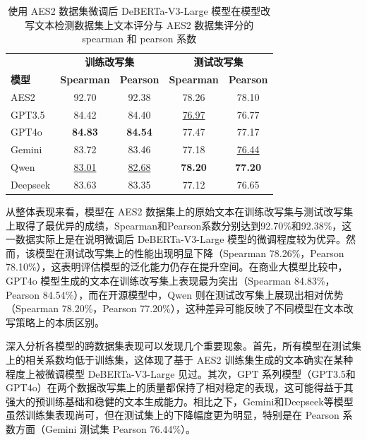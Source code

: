 \begin{table}[htbp]
\centering
\caption{使用 AES2 数据集微调后 DeBERTa-V3-Large 模型在模型改写文本检测数据集上文本评分与 AES2 数据集评分的 spearman 和 pearson 系数}
\begin{tabular}{l|cc|cc}
\toprule
\textbf{} & \multicolumn{2}{c}{\textbf{训练改写集}}    & \multicolumn{2}{c}{\textbf{测试改写集}} \\
\textbf{模型} & \textbf{Spearman}  & \textbf{Pearson} & \textbf{Spearman} & \textbf{Pearson}  \\ \midrule
AES2 \cite{learning-agency-lab-automated-essay-scoring-2}     & 92.70              & 92.38            & 78.26             & 78.10             \\
GPT3.5 \cite{chatgpt}   & 84.42              & 84.40            & \uline{76.97}     & 76.77             \\
GPT4o \cite{gpt4o}    & \textbf{84.83}     & \textbf{84.54}   & 77.47             & 77.17             \\
Gemini \cite{geminiteam2024geminifamilyhighlycapable}   & 83.72              & 83.46            & 77.18             & \uline{76.44}     \\
Qwen \cite{qwen2025qwen25technicalreport}     & \uline{83.01}      & \uline{82.68}    & \textbf{78.20}    & \textbf{77.20}    \\
Deepseek \cite{deepseekai2024deepseekv3technicalreport}  & 83.63              & 83.35            & 77.12             & 76.65             \\ \bottomrule
\end{tabular}
\label{tab:spearman}
\end{table}

从整体表现来看，模型在 AES2 数据集上的原始文本在训练改写集与测试改写集上取得了最优异的成绩，Spearman和Pearson系数分别达到92.70\%和92.38\%，这一数据实际上是在说明微调后 DeBERTa-V3-Large 模型的微调程度较为优异。然而，该模型在测试改写集上的性能出现明显下降（Spearman 78.26\%，Pearson 78.10\%），这表明评估模型的泛化能力仍存在提升空间。在商业大模型比较中，GPT4o 模型生成的文本在训练改写集上表现最为突出（Spearman 84.83\%，Pearson 84.54\%），而在开源模型中，Qwen 则在测试改写集上展现出相对优势（Spearman 78.20\%，Pearson 77.20\%），这种差异可能反映了不同模型在文本改写策略上的本质区别。

深入分析各模型的跨数据集表现可以发现几个重要现象。首先，所有模型在测试集上的相关系数均低于训练集，这体现了基于 AES2 训练集生成的文本确实在某种程度上被微调模型 DeBERTa-V3-Large 见过。其次，GPT 系列模型（GPT3.5和GPT4o）在两个数据改写集上的质量都保持了相对稳定的表现，这可能得益于其强大的预训练基础和稳健的文本生成能力。相比之下，Gemini和Deepseek等模型虽然训练集表现尚可，但在测试集上的下降幅度更为明显，特别是在 Pearson 系数方面（Gemini 测试集 Pearson 76.44\%）。

